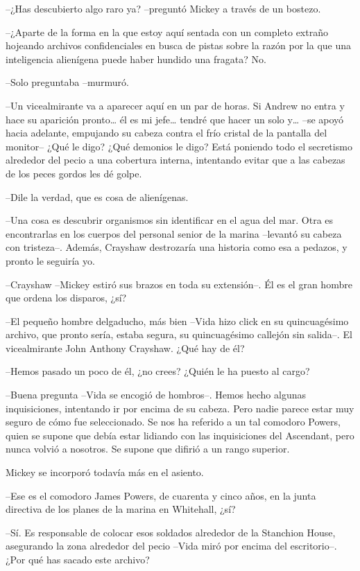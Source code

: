 {--¿Has descubierto algo raro ya? --preguntó Mickey a través de un
bostezo.}

{--¿Aparte de la forma en la que estoy aquí sentada con un completo
 extraño hojeando archivos confidenciales en busca de pistas sobre la
 razón por la que una inteligencia alienígena puede haber hundido una
fragata? No.}

{--Solo preguntaba --murmuró.}

{--Un vicealmirante va a aparecer aquí en un par de horas. Si Andrew no
 entra y hace su aparición pronto\ldots{} él es mi jefe\ldots{} tendré
 que hacer un solo y\ldots{} --se apoyó hacia adelante, empujando su
 cabeza contra el frío cristal de la pantalla del monitor-- ¿Qué le digo?
 ¿Qué demonios le digo? Está poniendo todo el secretismo alrededor del
 pecio a una cobertura interna, intentando evitar que a las cabezas de
los peces gordos les dé golpe.}

{--Dile la verdad, que es cosa de alienígenas.}

{--Una cosa es descubrir organismos sin identificar en el agua del mar.
 Otra es encontrarlas en los cuerpos del personal senior de la marina
 --levantó su cabeza con tristeza--. Además, Crayshaw destrozaría una
historia como esa a pedazos, y pronto le seguiría yo.}

{--Crayshaw --Mickey estiró sus brazos en toda su extensión--. Él es el
gran hombre que ordena los disparos, ¿sí?}

{--El pequeño hombre delgaducho, más bien --Vida hizo click en su
 quincuagésimo archivo, que pronto sería, estaba segura, su quincuagésimo
 callejón sin salida--. El vicealmirante John Anthony Crayshaw. ¿Qué hay
de él?}

{--Hemos pasado un poco de él, ¿no crees? ¿Quién le ha puesto al cargo?}

{--Buena pregunta --Vida se encogió de hombros--. Hemos hecho algunas
 inquisiciones, intentando ir por encima de su cabeza. Pero nadie parece
 estar muy seguro de cómo fue seleccionado. Se nos ha referido a un tal
 comodoro Powers, quien se supone que debía estar lidiando con las
 inquisiciones del Ascendant, pero nunca volvió a nosotros. Se supone que
difirió a un rango superior.}

{Mickey se incorporó todavía más en el asiento.}

{--Ese es el comodoro James Powers, de cuarenta y cinco años, en la
junta directiva de los planes de la marina en Whitehall, ¿sí?}

{--Sí. Es responsable de colocar esos soldados alrededor de la Stanchion
 House, asegurando la zona alrededor del pecio --Vida miró por encima del
escritorio--. ¿Por qué has sacado este archivo?}

